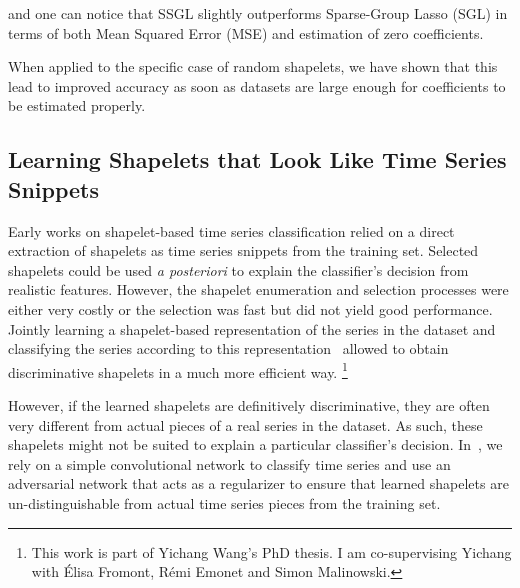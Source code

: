 and one can notice that SSGL slightly outperforms Sparse-Group Lasso (SGL) in
terms of both Mean Squared Error (MSE) and estimation of zero coefficients.

When applied to the specific case of random shapelets, we have shown that this
lead to improved accuracy as soon as datasets are large enough for coefficients
to be estimated properly.

\subsection{Learning Shapelets that Look Like Time Series Snippets}

Early works on shapelet-based time series classification relied on a direct
extraction of shapelets as time series snippets from the training set.
Selected shapelets could be used \emph{a posteriori} to explain the classifier's
decision from realistic features.
However, the shapelet enumeration and selection processes were either very
costly or the selection was fast but did not yield good performance.
Jointly learning a shapelet-based representation of the series in the dataset
and classifying the series according to this
representation~\cite{grabocka2014learning} allowed to obtain
discriminative shapelets in a much more efficient way.%
\footnote{This work is part of Yichang Wang's PhD thesis.
I am co-supervising Yichang with Élisa Fromont, Rémi Emonet and Simon
Malinowski.}

However, if the learned shapelets are definitively discriminative, they are
often very different from actual pieces of a real series in the
dataset. As such, these shapelets might not be suited to explain a particular
classifier's decision.
In~\cite{wang2020},
we rely on a simple convolutional network to classify time
series and use an adversarial network that acts as a regularizer to ensure that
learned shapelets are un-distinguishable from actual time series pieces from
the training set.
